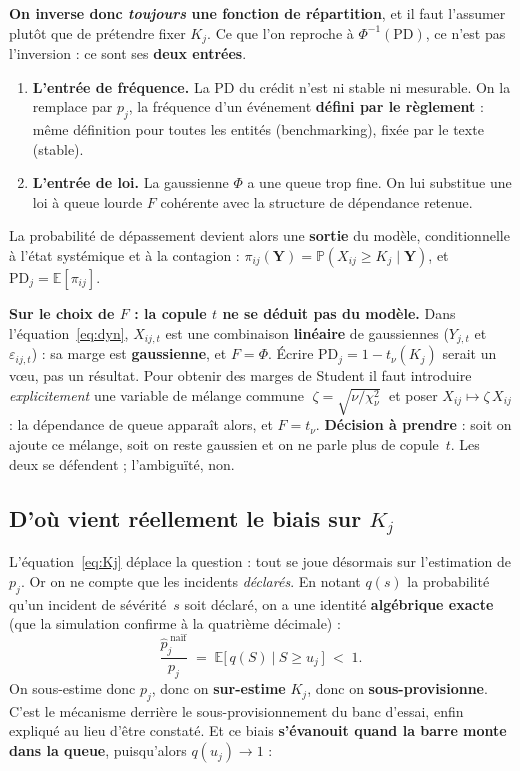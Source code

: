\documentclass[11pt,a4paper]{article}
\newcommand{\Y}{Y}
\newcommand{\eps}{\varepsilon}
\begin{document}
\noindent \textbf{On inverse donc \emph{toujours} une fonction de répartition}, et il faut
l'assumer plutôt que de prétendre \og{}fixer $K_j$\fg{}. Ce que l'on reproche à
$\Phi^{-1}(\mathrm{PD})$, ce n'est pas l'inversion : ce sont ses \textbf{deux entrées}.
\begin{enumerate}[leftmargin=1.4em,itemsep=2pt]
\item \textbf{L'entrée de fréquence.} La PD du crédit n'est ni stable ni mesurable. On la
  remplace par $p_j$, la fréquence d'un événement \textbf{défini par le règlement} :
  même définition pour toutes les entités (benchmarking), fixée par le texte (stable).
\item \textbf{L'entrée de loi.} La gaussienne $\Phi$ a une queue trop fine. On lui substitue
  une loi à queue lourde $F$ cohérente avec la structure de dépendance retenue.
\end{enumerate}
La probabilité de dépassement devient alors une \textbf{sortie} du modèle, conditionnelle à
l'état systémique et à la contagion : $\pi_{ij}(\mathbf Y) = \mathbb P(X_{ij} \ge K_j \mid
\mathbf Y)$, et $\mathrm{PD}_j = \mathbb E[\pi_{ij}]$.

\begin{attention}
\textbf{Sur le choix de $F$ : la copule $t$ ne se déduit pas du modèle.} Dans
l'équation~\eqref{eq:dyn}, $X_{ij,t}$ est une combinaison \textbf{linéaire} de gaussiennes
($\Y_{j,t}$ et $\eps_{ij,t}$) : sa marge est \textbf{gaussienne}, et $F = \Phi$. Écrire
$\mathrm{PD}_j = 1 - t_\nu(K_j)$ serait un v\oe u, pas un résultat. Pour obtenir des marges
de Student il faut introduire \emph{explicitement} une variable de mélange commune
$\;\zeta = \sqrt{\nu/\chi^2_\nu}\;$ et poser $X_{ij} \mapsto \zeta\,X_{ij}$ : la dépendance
de queue apparaît alors, et $F = t_\nu$. \textbf{Décision à prendre} : soit on ajoute ce
mélange, soit on reste gaussien et on ne parle plus de copule~$t$. Les deux se défendent ;
l'ambiguïté, non.
\end{attention}

\subsection*{D'où vient réellement le biais sur $K_j$}

L'équation~\eqref{eq:Kj} déplace la question : tout se joue désormais sur l'estimation de
$p_j$. Or on ne compte que les incidents \emph{déclarés}. En notant $q(s)$ la probabilité
qu'un incident de sévérité~$s$ soit déclaré, on a une identité \textbf{algébrique exacte}
(que la simulation confirme à la quatrième décimale) :
\begin{equation}
\frac{\hat p_j^{\;\text{naïf}}}{p_j} \;=\; \mathbb E\big[\,q(S)\ \big|\ S \ge u_j\,\big]
\;<\; 1 .
\end{equation}
On sous-estime donc $p_j$, donc on \textbf{sur-estime} $K_j$, donc on
\textbf{sous-provisionne}. C'est le mécanisme derrière le sous-provisionnement du banc
d'essai, enfin expliqué au lieu d'être constaté. Et ce biais \textbf{s'évanouit quand la
barre monte dans la queue}, puisqu'alors $q(u_j) \to 1$ :
\end{document}
